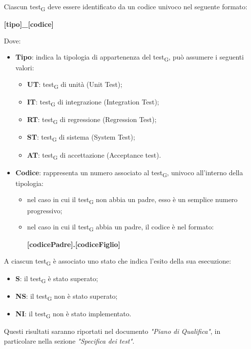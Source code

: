 Ciascun {test\textsubscript{G}} deve essere identificato da un codice univoco nel seguente formato:
\begin{center}
    \textbf{[tipo]\_[codice]}
\end{center}
Dove:
\begin{itemize}
    \item \textbf{Tipo}: indica la tipologia di appartenenza del {test\textsubscript{G}}, può assumere i seguenti valori:
        \begin{itemize}
            \item \textbf{UT}: {test\textsubscript{G}} di unità (Unit Test);
            \item \textbf{IT}: {test\textsubscript{G}} di integrazione (Integration Test);
            \item \textbf{RT}: {test\textsubscript{G}} di regressione (Regression Test);
            \item \textbf{ST}: {test\textsubscript{G}} di sistema (System Test);
            \item \textbf{AT}: {test\textsubscript{G}} di accettazione (Acceptance test).
        \end{itemize}
    \item \textbf{Codice}: rappresenta un numero associato al {test\textsubscript{G}}, univoco all'interno della tipologia:
        \begin{itemize}
            \item nel caso in cui il {test\textsubscript{G}} non abbia un padre, esso è un semplice numero progressivo;
            \item nel caso in cui il {test\textsubscript{G}} abbia un padre, il codice è nel formato:
            \begin{center}
                \textbf{[codicePadre].[codiceFiglio]}
            \end{center}
        \end{itemize}
\end{itemize}

A ciascun {test\textsubscript{G}} è associato uno stato che indica l'esito della sua esecuzione:
\begin{itemize}
    \item \textbf{S}: il {test\textsubscript{G}} è stato superato;
    \item \textbf{NS}: il {test\textsubscript{G}} non è stato superato;
    \item \textbf{NI}: il {test\textsubscript{G}} non è stato implementato.
\end{itemize}
Questi risultati saranno riportati nel documento \textit{"Piano di Qualifica"}, in particolare nella sezione \textit{"Specifica dei test"}.

